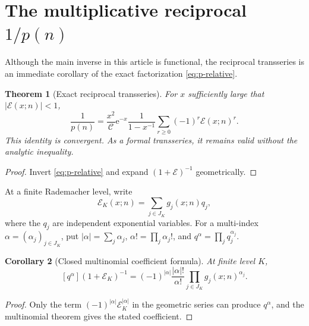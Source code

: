 \documentclass[11pt,a4paper]{article}
\numberwithin{equation}{section}
\newtheorem{theorem}{Theorem}[section]
\newtheorem{corollary}[theorem]{Corollary}
\theoremstyle{remark}
\newcommand{\e}{\mathrm e}
\newcommand{\Ccal}{\mathcal C}
\newcommand{\Ecal}{\mathcal E}
\begin{document}
\section{The multiplicative reciprocal \texorpdfstring{$1/p(n)$}{1/p(n)}}\label{sec:reciprocal}

Although the main inverse in this article is functional, the reciprocal transseries is an immediate corollary of the exact factorization \cref{eq:p-relative}.

\begin{theorem}[Exact reciprocal transseries]\label{thm:reciprocal}
For $x$ sufficiently large that $|\Ecal(x;n)|<1$,
\begin{equation}\label{eq:reciprocal-exact}
 \frac1{p(n)}
 =\frac{x^2}{\Ccal}\e^{-x}
 \frac1{1-x^{-1}}
 \sum_{r\ge0}(-1)^r\Ecal(x;n)^r.
\end{equation}
This identity is convergent.  As a formal transseries, it remains valid without the analytic inequality.
\end{theorem}

\begin{proof}
Invert \cref{eq:p-relative} and expand $(1+\Ecal)^{-1}$ geometrically.
\end{proof}

At a finite Rademacher level, write
\begin{equation}\label{eq:E-linear-q}
 \Ecal_K(x;n)=\sum_{j\in J_K}g_j(x;n)q_j,
\end{equation}
where the $q_j$ are independent exponential variables.  For a multi-index
$\alpha=(\alpha_j)_{j\in J_K}$, put
$|\alpha|=\sum_j\alpha_j$, $\alpha!=\prod_j\alpha_j!$, and
$q^\alpha=\prod_jq_j^{\alpha_j}$.

\begin{corollary}[Closed multinomial coefficient formula]\label{cor:reciprocal-multi}
At finite level $K$,
\begin{equation}\label{eq:reciprocal-multi}
 [q^\alpha](1+\Ecal_K)^{-1}
 =(-1)^{|\alpha|}\frac{|\alpha|!}{\alpha!}
 \prod_{j\in J_K}g_j(x;n)^{\alpha_j}.
\end{equation}
\end{corollary}

\begin{proof}
Only the term $(-1)^{|\alpha|}\Ecal_K^{|\alpha|}$ in the geometric series can produce $q^\alpha$, and the multinomial theorem gives the stated coefficient.
\end{proof}
\end{document}
